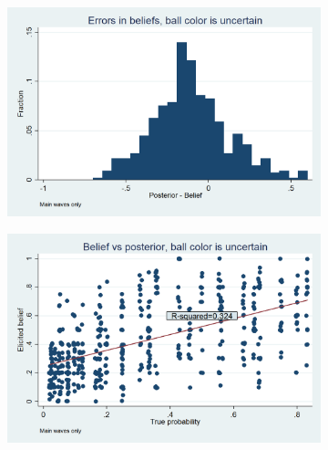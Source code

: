 \documentclass[11pt,a4paper]{article}
\begin{document}
\begin{figure}[H]
\centering
\caption{Belief Updating}
\begin{subfigure}[t]{.48\textwidth}
  \centering
  \includegraphics[width=\textwidth]{Graphs/hist_belief_error_s4.png}
\end{subfigure}
\begin{subfigure}[t]{.48\textwidth}
  \centering
  \includegraphics[width=\textwidth]{Graphs/updating_s4.png}


\end{subfigure}
\end{figure}
\end{document}
